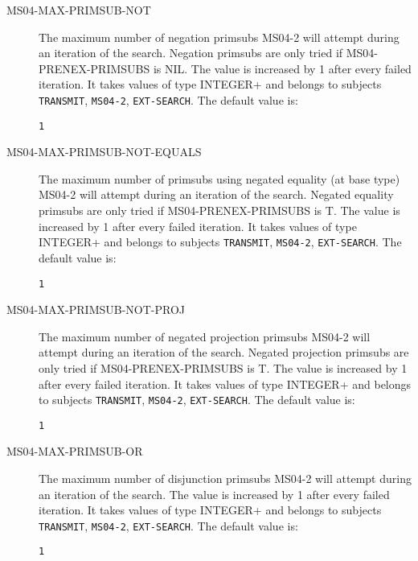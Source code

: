 \begin{description}
\item[MS04-MAX-PRIMSUB-NOT]  
The maximum number of negation primsubs MS04-2 will attempt during an iteration of the search.
Negation primsubs are only tried if MS04-PRENEX-PRIMSUBS is NIL.
The value is increased by 1 after every failed iteration.
It takes values of type INTEGER+ and belongs to subjects \texttt{TRANSMIT}, \texttt{MS04-2}, \texttt{EXT-SEARCH}.  The default value is: \begin{lstlisting}
1
\end{lstlisting}

\item[MS04-MAX-PRIMSUB-NOT-EQUALS]  
The maximum number of primsubs using negated equality (at base type) MS04-2 will attempt during an iteration of the search.
Negated equality primsubs are only tried if MS04-PRENEX-PRIMSUBS is T.
The value is increased by 1 after every failed iteration.
It takes values of type INTEGER+ and belongs to subjects \texttt{TRANSMIT}, \texttt{MS04-2}, \texttt{EXT-SEARCH}.  The default value is: \begin{lstlisting}
1
\end{lstlisting}

\item[MS04-MAX-PRIMSUB-NOT-PROJ]  
The maximum number of negated projection primsubs MS04-2 will attempt during an iteration of the search.
Negated projection primsubs are only tried if MS04-PRENEX-PRIMSUBS is T.
The value is increased by 1 after every failed iteration.
It takes values of type INTEGER+ and belongs to subjects \texttt{TRANSMIT}, \texttt{MS04-2}, \texttt{EXT-SEARCH}.  The default value is: \begin{lstlisting}
1
\end{lstlisting}

\item[MS04-MAX-PRIMSUB-OR]  
The maximum number of disjunction primsubs MS04-2 will attempt during an iteration of the search.
The value is increased by 1 after every failed iteration.
It takes values of type INTEGER+ and belongs to subjects \texttt{TRANSMIT}, \texttt{MS04-2}, \texttt{EXT-SEARCH}.  The default value is: \begin{lstlisting}
1
\end{lstlisting}


\end{description}
